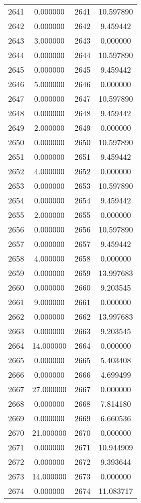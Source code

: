 \documentclass[12pt]{article}
\begin{document}
\begin{longtable}{@{}cccc@{}}
2641 & 0.000000 & 2641 & 10.597890 \\
2642 & 0.000000 & 2642 & 9.459442 \\
2643 & 3.000000 & 2643 & 0.000000 \\
2644 & 0.000000 & 2644 & 10.597890 \\
2645 & 0.000000 & 2645 & 9.459442 \\
2646 & 5.000000 & 2646 & 0.000000 \\
2647 & 0.000000 & 2647 & 10.597890 \\
2648 & 0.000000 & 2648 & 9.459442 \\
2649 & 2.000000 & 2649 & 0.000000 \\
2650 & 0.000000 & 2650 & 10.597890 \\
2651 & 0.000000 & 2651 & 9.459442 \\
2652 & 4.000000 & 2652 & 0.000000 \\
2653 & 0.000000 & 2653 & 10.597890 \\
2654 & 0.000000 & 2654 & 9.459442 \\
2655 & 2.000000 & 2655 & 0.000000 \\
2656 & 0.000000 & 2656 & 10.597890 \\
2657 & 0.000000 & 2657 & 9.459442 \\
2658 & 4.000000 & 2658 & 0.000000 \\
2659 & 0.000000 & 2659 & 13.997683 \\
2660 & 0.000000 & 2660 & 9.203545 \\
2661 & 9.000000 & 2661 & 0.000000 \\
2662 & 0.000000 & 2662 & 13.997683 \\
2663 & 0.000000 & 2663 & 9.203545 \\
2664 & 14.000000 & 2664 & 0.000000 \\
2665 & 0.000000 & 2665 & 5.403408 \\
2666 & 0.000000 & 2666 & 4.699499 \\
2667 & 27.000000 & 2667 & 0.000000 \\
2668 & 0.000000 & 2668 & 7.814180 \\
2669 & 0.000000 & 2669 & 6.660536 \\
2670 & 21.000000 & 2670 & 0.000000 \\
2671 & 0.000000 & 2671 & 10.944909 \\
2672 & 0.000000 & 2672 & 9.393644 \\
2673 & 14.000000 & 2673 & 0.000000 \\
2674 & 0.000000 & 2674 & 11.083717 \\

\end{longtable}
\end{document}
